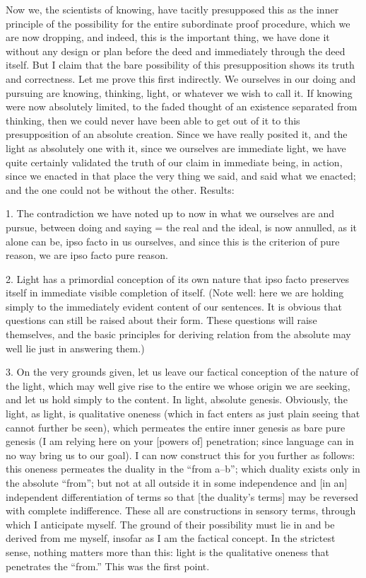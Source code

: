 Now we, the scientists of knowing, have tacitly
presupposed this as the inner principle of
the possibility for the entire subordinate proof procedure,
which we are now dropping,
and indeed, this is the important thing,
we have done it without any design or plan
before the deed and immediately through the deed itself.
But I claim that the bare possibility
of this presupposition shows its truth and correctness.
Let me prove this first indirectly.
We ourselves in our doing and pursuing are knowing,
thinking, light, or whatever we wish to call it.
If knowing were now absolutely limited,
to the faded thought of an existence separated from thinking,
then we could never have been able to get out of it
to this presupposition of an absolute creation.
Since we have really posited it,
and the light as absolutely one with it,
since we ourselves are immediate light,
we have quite certainly validated the truth
of our claim in immediate being, in action,
since we enacted in that place the very thing we said,
and said what we enacted;
and the one could not be without the other.
Results:

1. The contradiction we have noted up to now in
what we ourselves are and pursue,
between doing and saying = the real and the ideal,
is now annulled, as it alone can be,
ipso facto in us ourselves,
and since this is the criterion of pure reason,
we are ipso facto pure reason.

2. Light has a primordial conception of its own nature
that ipso facto preserves itself in immediate
visible completion of itself.
(Note well: here we are holding simply to the
immediately evident content of our sentences.
It is obvious that questions can
still be raised about their form.
These questions will raise themselves,
and the basic principles for deriving relation
from the absolute may well lie just in answering them.)

3. On the very grounds given, let us leave our
factical conception of the nature of the light,
which may well give rise to the entire we
whose origin we are seeking,
and let us hold simply to the content.
In light, absolute genesis.
Obviously, the light, as light, is qualitative oneness
(which in fact enters as just plain seeing
that cannot further be seen),
which permeates the entire
inner genesis as bare pure genesis
(I am relying here on your [powers of] penetration;
since language can in no way bring us to our goal).
I can now construct this for you further as follows:
this oneness permeates the duality in the “from a–b”;
which duality exists only in the absolute “from”;
but not at all outside it in some independence
and [in an] independent differentiation of terms
so that [the duality's terms] may be reversed
with complete indifference.
These all are constructions in sensory terms,
through which I anticipate myself.
The ground of their possibility must lie in
and be derived from me myself,
insofar as I am the factical concept.
In the strictest sense, nothing matters more than this:
light is the qualitative oneness that penetrates the “from.”
This was the first point.


